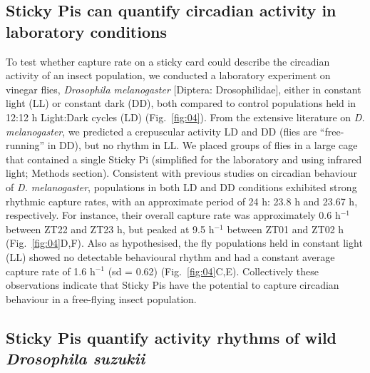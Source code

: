 \documentclass[fleqn,10pt]{wlscirep}
\begin{document}
\subsection*{Sticky Pis can quantify circadian activity in laboratory conditions}
To test whether capture rate on a sticky card could describe the circadian activity of an insect population, we conducted a laboratory experiment on vinegar flies, \emph{Drosophila melanogaster} [Diptera: Drosophilidae], either in constant light (LL) or constant dark (DD), both compared to control populations held in 12:12 h Light:Dark cycles (LD) (Fig.~\ref{fig:04}). From the extensive literature on \emph{D. melanogaster}, we predicted a crepuscular activity LD and DD (flies are “free-running” in DD), but no rhythm in LL\cite{tataroglu_studying_2014}. We placed groups of flies in a large cage that contained a single Sticky Pi (simplified for the laboratory and using infrared light; Methods section). Consistent with previous studies on circadian behaviour of \emph{D. melanogaster}, populations in both LD and DD conditions exhibited strong rhythmic capture rates, with an approximate period of 24 h: 23.8 h and 23.67 h, respectively. For instance, their overall capture rate was approximately 0.6 h$^{-1}$ between ZT22 and ZT23 h, but peaked at 9.5 h$^{-1}$ between ZT01 and ZT02 h (Fig.~\ref{fig:04}D,F). Also as hypothesised, the fly populations held in constant light (LL) showed no detectable behavioural rhythm and had a constant average capture rate of 1.6 h$^{-1}$ (sd = 0.62) (Fig.~\ref{fig:04}C,E). Collectively these observations indicate that Sticky Pis have the potential to capture circadian behaviour in a free-flying insect population.

\subsection*{Sticky Pis quantify activity rhythms of wild \emph{Drosophila suzukii}}
\end{document}
